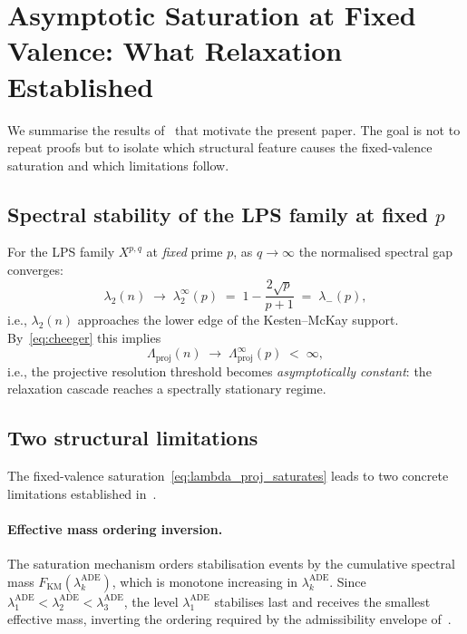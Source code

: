 \documentclass[11pt]{article}
\newcommand{\Lproj}{\Lambda_{\mathrm{proj}}}
\newcommand{\lADE}[1]{\lambda_{#1}^{\mathrm{ADE}}}
\newcommand{\FKM}{F_{\mathrm{KM}}}
\begin{document}
  \section{Asymptotic Saturation at Fixed Valence: What Relaxation Established}
    \label{sec:saturation}


    We summarise the results of~\cite{Beau2026a5} that motivate the present paper.
    The goal is not to repeat proofs but to isolate which structural feature causes
    the fixed-valence saturation and which limitations follow.

    \subsection{Spectral stability of the LPS family at fixed $p$}
      \label{subsec:fixed_p}

      For the LPS family $X^{p,q}$ at \emph{fixed} prime $p$, as $q \to \infty$
      the normalised spectral gap converges:
      \begin{equation}
        \lambda_2(n) \;\longrightarrow\; \lambda_2^\infty(p)
        \;=\; 1 - \frac{2\sqrt{p}}{p+1} \;=\; \lambda_-(p),
        \label{eq:lambda2_limit}
      \end{equation}
      i.e., $\lambda_2(n)$ approaches the lower edge of the Kesten--McKay support.
      By~\eqref{eq:cheeger} this implies
      \begin{equation}
        \Lproj(n) \;\longrightarrow\; \Lproj^\infty(p) \;<\; \infty,
        \label{eq:lambda_proj_saturates}
      \end{equation}
      i.e., the projective resolution threshold becomes \emph{asymptotically
  constant}: the relaxation cascade reaches a spectrally stationary regime.

    \subsection{Two structural limitations}
      \label{subsec:two_limitations}

      The fixed-valence saturation~\eqref{eq:lambda_proj_saturates} leads to two
      concrete limitations established in~\cite{Beau2026a5}.

      \paragraph{Effective mass ordering inversion.}
        The saturation mechanism orders stabilisation events by the cumulative spectral
        mass $\FKM(\lADE{k})$, which is monotone increasing in $\lADE{k}$.
        Since $\lADE{1} < \lADE{2} < \lADE{3}$, the level $\lADE{1}$ stabilises last
        and receives the smallest effective mass, inverting the ordering required by
        the admissibility envelope of~\cite{Beau2026a4}.
\end{document}

